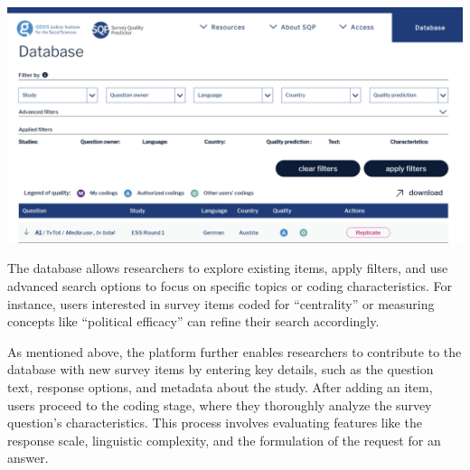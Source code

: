 \documentclass[
  letterpaper,
  DIV=11,
  numbers=noendperiod]{scrartcl}
\begin{document}
\includegraphics{img/landing_page.png}

The database allows researchers to explore existing items, apply
filters, and use advanced search options to focus on specific topics or
coding characteristics. For instance, users interested in survey items
coded for ``centrality'' or measuring concepts like ``political
efficacy'' can refine their search accordingly.

As mentioned above, the platform further enables researchers to
contribute to the database with new survey items by entering key
details, such as the question text, response options, and metadata about
the study. After adding an item, users proceed to the coding stage,
where they thoroughly analyze the survey question's characteristics.
This process involves evaluating features like the response scale,
linguistic complexity, and the formulation of the request for an answer.
\end{document}
